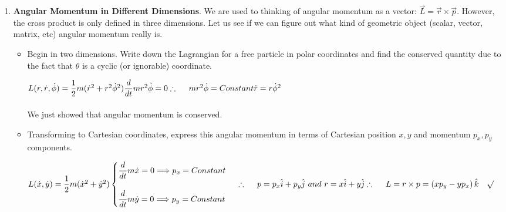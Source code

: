\documentclass[fleqn]{article}
\begin{document}
\begin{enumerate}
    \pagebreak

    \item \textbf{Angular Momentum in Different Dimensions}. We are used to thinking of angular momentum as a vector:
    $\overrightarrow{L}=\overrightarrow{r} \times \overrightarrow{p}$. However, the cross product is only defined in three dimensions. Let us
    see if we can figure out what kind of geometric object (scalar, vector,
    matrix, etc) angular momentum really is.
    \begin{itemize}
      \item Begin in two dimensions. Write down the Lagrangian for a free
      particle in polar coordinates and find the conserved quantity due
      to the fact that $\theta$ is a cyclic (or ignorable) coordinate.

        \textcolor{hwColor}{
          $
            L(r, \dot{r}, \dot{\phi})=\dfrac{1}{2} m (\dot{r}^2+r^2 \dot{\phi}^2)
            \\
            \\
            \dfrac{d}{dt} mr^2 \dot{\phi}=0 
            \\
            \\
            \therefore ~~~~ mr^2 \dot{\phi}=Constant
            \\
            \\
            \ddot{r}=r \dot{\phi}^2
          $
          \\
          \\
          We just showed that angular momentum is conserved.
        }

      \item Transforming to Cartesian coordinates, express this angular momentum in terms of Cartesian position
      $x, y$ and momentum $p_x, p_y$ components.

        \textcolor{hwColor}{
          $
            L(\dot{x}, \dot{y})=\dfrac{1}{2}m (\dot{x}^2+\dot{y}^2)
            \\
            \\
            \begin{cases}
              \dfrac{d}{dt}m \dot{x}=0 \Longrightarrow p_x=Constant
              \\
              \\
              \dfrac{d}{dt}m \dot{y}=0 \Longrightarrow p_y=Constant
            \end{cases}
            \\
            \\
            \therefore ~~~~ p=p_x \hat{i}+p_y \hat{j} ~ and ~ r=x \hat{i}+y \hat{j}
            \\
            \\
            \therefore ~~~~ L=r \times p=\left(x p_y-yp_x\right) \hat{k} ~~~ \surd
          $
        }


\end{itemize}
\end{enumerate}
\end{document}
